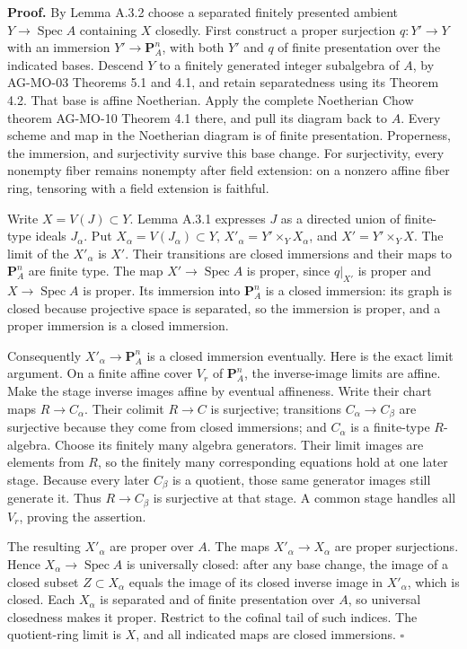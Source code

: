 \documentclass[11pt]{article}
\begin{document}
\textbf{Proof.} By Lemma A.3.2 choose a separated finitely presented
ambient \(Y\to\operatorname{Spec}A\) containing \(X\) closedly. First
construct a proper surjection \(q:Y'\to Y\) with an immersion
\(Y'\to\mathbf P^n_A\), with both \(Y'\) and \(q\) of finite
presentation over the indicated bases. Descend \(Y\) to a finitely
generated integer subalgebra of \(A\), by AG-MO-03 Theorems 5.1 and 4.1,
and retain separatedness using its Theorem 4.2. That base is affine
Noetherian. Apply the complete Noetherian Chow theorem AG-MO-10 Theorem
4.1 there, and pull its diagram back to \(A\). Every scheme and map in
the Noetherian diagram is of finite presentation. Properness, the
immersion, and surjectivity survive this base change. For surjectivity,
every nonempty fiber remains nonempty after field extension: on a
nonzero affine fiber ring, tensoring with a field extension is faithful.

Write \(X=V(J)\subset Y\). Lemma A.3.1 expresses \(J\) as a directed
union of finite-type ideals \(J_\alpha\). Put
\(X_\alpha=V(J_\alpha)\subset Y\), \(X'_\alpha=Y'\times_Y X_\alpha\),
and \(X'=Y'\times_Y X\). The limit of the \(X'_\alpha\) is \(X'\). Their
transitions are closed immersions and their maps to \(\mathbf P^n_A\)
are finite type. The map \(X'\to\operatorname{Spec}A\) is proper, since
\(q|_{X'}\) is proper and \(X\to\operatorname{Spec}A\) is proper. Its
immersion into \(\mathbf P^n_A\) is a closed immersion: its graph is
closed because projective space is separated, so the immersion is
proper, and a proper immersion is a closed immersion.

Consequently \(X'_\alpha\to\mathbf P^n_A\) is a closed immersion
eventually. Here is the exact limit argument. On a finite affine cover
\(V_r\) of \(\mathbf P^n_A\), the inverse-image limits are affine. Make
the stage inverse images affine by eventual affineness. Write their
chart maps \(R\to C_\alpha\). Their colimit \(R\to C\) is surjective;
transitions \(C_\alpha\to C_\beta\) are surjective because they come
from closed immersions; and \(C_\alpha\) is a finite-type \(R\)-algebra.
Choose its finitely many algebra generators. Their limit images are
elements from \(R\), so the finitely many corresponding equations hold
at one later stage. Because every later \(C_\beta\) is a quotient, those
same generator images still generate it. Thus \(R\to C_\beta\) is
surjective at that stage. A common stage handles all \(V_r\), proving
the assertion.

The resulting \(X'_\alpha\) are proper over \(A\). The maps
\(X'_\alpha\to X_\alpha\) are proper surjections. Hence
\(X_\alpha\to\operatorname{Spec}A\) is universally closed: after any
base change, the image of a closed subset \(Z\subset X_\alpha\) equals
the image of its closed inverse image in \(X'_\alpha\), which is closed.
Each \(X_\alpha\) is separated and of finite presentation over \(A\), so
universal closedness makes it proper. Restrict to the cofinal tail of
such indices. The quotient-ring limit is \(X\), and all indicated maps
are closed immersions. \(\square\)
\end{document}
